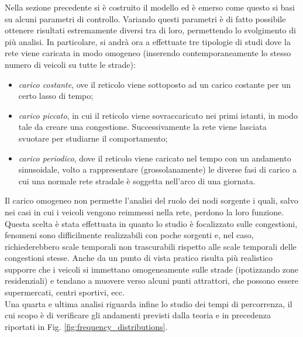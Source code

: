 \documentclass[../main.tex]{subfiles}
\begin{document}
Nella sezione precedente si \`e costruito il modello ed \`e emerso come questo si basi su alcuni parametri di controllo.
Variando questi parametri \`e di fatto possibile ottenere risultati estremamente diversi tra di loro, permettendo lo svolgimento di pi\`u analisi.
In particolare, si andr\`a ora a effettuate tre tipologie di studi dove la rete viene caricata in modo omogeneo (inserendo contemporaneamente lo stesso numero di veicoli su tutte le strade):
\begin{itemize}
    \item \emph{carico costante}, ove il reticolo viene sottoposto ad un carico costante per un certo lasso di tempo;
    \item \emph{carico piccato}, in cui il reticolo viene sovraccaricato nei primi istanti, in modo tale da creare una congestione. Successivamente la rete viene lasciata svuotare per studiarne il comportamento;
    \item \emph{carico periodico}, dove il reticolo viene caricato nel tempo con un andamento sinusoidale, volto a rappresentare (grossolanamente) le diverse fasi di carico a cui una normale rete stradale \`e soggetta nell'arco di una giornata.
\end{itemize}
Il carico omogeneo non permette l'analisi del ruolo dei nodi sorgente i quali, salvo nei casi in cui i veicoli vengono reimmessi nella rete, perdono la loro funzione.
Questa scelta \`e stata effettuata in quanto lo studio \`e focalizzato sulle congestioni, fenomeni sono difficilmente realizzabili con poche sorgenti e, nel caso, richiederebbero scale temporali non trascurabili rispetto alle scale temporali delle congestioni stesse.
Anche da un punto di vista pratico risulta pi\`u realistico supporre che i veicoli si immettano omogeneamente sulle strade (ipotizzando zone residenziali) e tendano a muovere verso alcuni punti attrattori, che possono essere supermercati, centri sportivi, ecc.\\
Una quarta e ultima analisi riguarda infine lo studio dei tempi di percorrenza, il cui scopo \`e di verificare gli andamenti previsti dalla teoria e in precedenza riportati in Fig. \ref{fig:frequency_distributions}.
\end{document}
